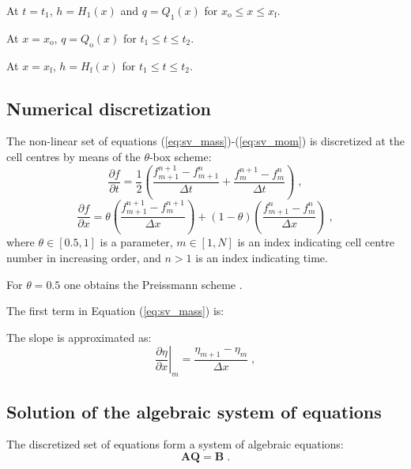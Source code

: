 \documentclass{deltares_report_elv}
\newcommand{\mathsub}[2]{#1_{\mathrm{#2}}}
\begin{document}
At $t=\mathsub{t}{1}$, $h=\mathsub{H}{1}(x)$ and $q=\mathsub{Q}{1}(x)$ for $\mathsub{x}{o}\leq x \leq\mathsub{x}{f}$.

At $x=\mathsub{x}{o}$, $q=\mathsub{Q}{o}(x)$ for $\mathsub{t}{1}\leq t \leq\mathsub{t}{2}$.

At $x=\mathsub{x}{f}$, $h=\mathsub{H}{f}(x)$ for $\mathsub{t}{1}\leq t \leq\mathsub{t}{2}$.

\subsection{Numerical discretization}

The non-linear set of equations (\ref{eq:sv_mass})-(\ref{eq:sv_mom}) is discretized at the cell centres by means of the $\theta$-box scheme:
\begin{equation}
\frac{\partial f}{\partial t}=\frac{1}{2}\left(\frac{f_{m+1}^{n+1}-f_{m+1}^{n}}{\Delta t}+\frac{f_{m}^{n+1}-f_{m}^{n}}{\Delta t}\right) \;,
\end{equation}
\begin{equation}
\frac{\partial f}{\partial x}=\theta\left(\frac{f_{m+1}^{n+1}-f_{m}^{n+1}}{\Delta x}\right)+\left(1-\theta\right)\left(\frac{f_{m+1}^{n}-f_{m}^{n}}{\Delta x}\right) \;,
\end{equation}
where $\theta\in[0.5,1]$ is a parameter, $m\in[1,N]$ is an index indicating cell centre number in increasing order, and $n>1$ is an index indicating time. 

For $\theta=0.5$ one obtains the Preissmann scheme \citep{Preissmann61_2,Preissmann61_3,Lyn87_2}.


The first term in Equation (\ref{eq:sv_mass}) is:


The slope is approximated as:
\begin{equation}
\left.\frac{\partial \eta}{\partial x}\right|_{m}=\frac{\eta_{m+1}-\eta_{m}}{\Delta x} \;,
\end{equation}




\subsection{Solution of the algebraic system of equations}

The discretized set of equations form a system of algebraic equations:
\begin{equation}
\label{eq:alg}
\mathbf{A}\mathbf{Q}=\mathbf{B}\;.
\end{equation}
\end{document}
